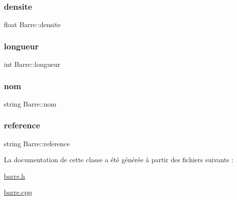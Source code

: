 \subsubsection{\texorpdfstring{densite}{densite}}
{\footnotesize\ttfamily float Barre\+::densite\hspace{0.3cm}{\ttfamily [protected]}}

\mbox{\label{class_barre_a59f5637eaf9c15084deafab15f0de07d}} 
\subsubsection{\texorpdfstring{longueur}{longueur}}
{\footnotesize\ttfamily int Barre\+::longueur\hspace{0.3cm}{\ttfamily [protected]}}

\mbox{\label{class_barre_a28ab665131a097ea05e175e461375362}} 
\subsubsection{\texorpdfstring{nom}{nom}}
{\footnotesize\ttfamily string Barre\+::nom\hspace{0.3cm}{\ttfamily [protected]}}

\mbox{\label{class_barre_a787dda4b06eba9eac805fc67720d4a11}} 
\subsubsection{\texorpdfstring{reference}{reference}}
{\footnotesize\ttfamily string Barre\+::reference\hspace{0.3cm}{\ttfamily [protected]}}



La documentation de cette classe a été générée à partir des fichiers suivants \+:\begin{DoxyCompactItemize}
\item 
\hyperlink{barre_8h}{barre.\+h}\item 
\hyperlink{barre_8cpp}{barre.\+cpp}\end{DoxyCompactItemize}
